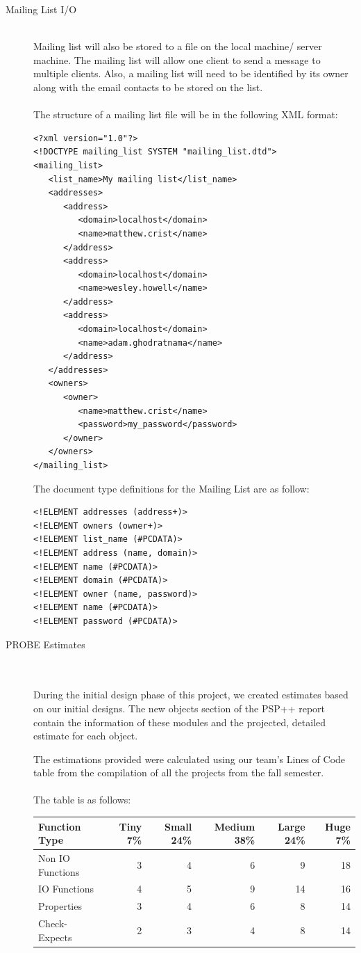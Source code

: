 \documentclass[11pt, letterpaper]{report}
\begin{document}
\begin{description}
\item[Mailing List I/O] \hfill \\
Mailing list will also be stored to a file on the local machine/ server machine. The mailing list will allow one client to send a message to multiple clients. Also, a mailing list will need to be identified by its owner along with the email contacts to be stored on the list. \\ \\The structure of a mailing list file will be in the following XML format: 
\begin{verbatim}
<?xml version="1.0"?>
<!DOCTYPE mailing_list SYSTEM "mailing_list.dtd">
<mailing_list>
   <list_name>My mailing list</list_name>
   <addresses>
      <address>
         <domain>localhost</domain>
         <name>matthew.crist</name>
      </address>
      <address>
         <domain>localhost</domain>
         <name>wesley.howell</name>
      </address>
      <address>
         <domain>localhost</domain>
         <name>adam.ghodratnama</name>
      </address>
   </addresses>
   <owners>
      <owner>
         <name>matthew.crist</name>
         <password>my_password</password>
      </owner>
   </owners>
</mailing_list>
\end{verbatim}
The document type definitions for the Mailing List are as follow: 
\begin{verbatim}
<!ELEMENT addresses (address+)>
<!ELEMENT owners (owner+)>
<!ELEMENT list_name (#PCDATA)>
<!ELEMENT address (name, domain)>
<!ELEMENT name (#PCDATA)>
<!ELEMENT domain (#PCDATA)>
<!ELEMENT owner (name, password)>
<!ELEMENT name (#PCDATA)>
<!ELEMENT password (#PCDATA)>
\end{verbatim}

\newpage
\hypertarget{PROBE Estimates} {}
\item[\Large PROBE Estimates] \hfill \\ \hfill \\
During the initial design phase of this project, we created estimates based on our initial designs. The new objects section of the PSP++ report contain the information of these modules and the projected, detailed estimate for each object. 

The estimations provided were calculated using our team's Lines of Code table from the compilation of all the projects from the fall semester. \\ \\
The table is as follows:
\begin{table}[htdp]
\begin{center}
\begin{tabular}{lrrrrr}
Function Type & Tiny 7\% & Small 24\% & Medium 38\% & Large 24\% & Huge 7\% \\
\hline
Non IO Functions & 3 & 4 & 6 & 9 & 18 \\
IO Functions & 4 & 5 & 9 & 14 & 16\\
Properties & 3 & 4 & 6 & 8 & 14 \\
Check-Expects & 2 & 3 & 4 & 8 & 14\\
\hline
\end{tabular}
\end{center} 
\end{table}%


\end{description}
\end{document}
